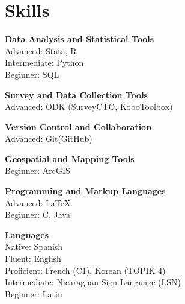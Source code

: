 \documentclass[a4paper,10pt]{article}
\renewenvironment{itemize}{
  \begin{list}{}
    { \setlength{\itemsep}{5pt}
      \setlength{\parsep}{0pt}
      \setlength{\topsep}{0pt}
      \setlength{\leftmargin}{0em} } }{
  \end{list}}
\begin{document}

\section*{Skills}
\begin{itemize}
    \item \textbf{Data Analysis and Statistical Tools} \\ 
    Advanced: Stata, R \\ 
    Intermediate: Python \\ 
    Beginner: SQL
    \item \textbf{Survey and Data Collection Tools} \\ 
    Advanced: ODK (SurveyCTO, KoboToolbox)
    \item \textbf{Version Control and Collaboration} \\ 
    Advanced: Git(GitHub)
    \item \textbf{Geospatial and Mapping Tools} \\ 
    Beginner: ArcGIS
    \item \textbf{Programming and Markup Languages} \\ 
    Advanced: \LaTeX \\ 
    Beginner: C, Java
    \item \textbf{Languages} \\
    Native: Spanish \\
    Fluent: English \\
    Proficient: French (C1), Korean (TOPIK 4)    \\
    Intermediate: Nicaraguan Sign Language (LSN) \\
    Beginner: Latin
\end{itemize}
\end{document}
